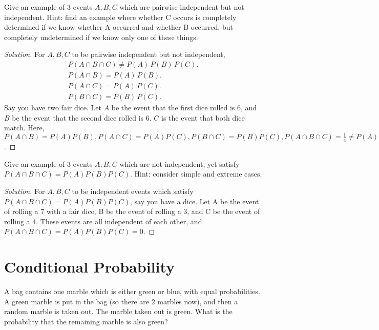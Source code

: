 \documentclass[10pt]{article}
\newenvironment{problem}[2][Problem]{\begin{trivlist}
\item[\hskip \labelsep {\bfseries #1}\hskip \labelsep {\bfseries #2.}]}{\end{trivlist}}
\begin{document}
\begin{problem}{3} 
Give an example of 3 events $A, B, C$ which are pairwise independent but not
independent. Hint: find an example where whether C occurs is completely
determined if we know whether A occurred and whether B occurred, but completely undetermined if we know only one of these things.
\end{problem}

\begin{proof}[Solution]
For $A, B, C$ to be pairwise independent but not independent,
\begin{equation}
\begin{split}
P(A \cap B \cap C) \neq P(A) \, P(B) \,P(C). \\
P(A \cap B) = P(A) \, P(B). \\
P(A \cap C) = P(A) \, P(C). \\
P(B \cap C) = P(B) \, P(C).
\end{split}
\end{equation}
Say you have two fair dice. Let $A$ be the event that the first dice rolled is 6, and $B$ be the event that the second dice rolled is 6. $C$ is the event that both dice match. Here, \(P(A \cap B) = P(A)P(B), P(A \cap C) = P(A)P(C), P(B \cap C) = P(B)P(C), P(A \cap B \cap C) = \frac{1}{4} \neq P(A)P(B)P(C)\).
\end{proof}

\begin{problem}{4} 
Give an example of 3 events $A, B, C$ which are not independent, yet satisfy
$P(A \cap B \cap C) = P(A)P(B)P(C)$. Hint: consider simple and extreme cases.
\end{problem}

\begin{proof}[Solution]
For $A, B, C$ to be independent events which satisfy $P(A \cap B \cap C) = P(A)P(B)P(C)$, say you have a dice. Let A be the event of rolling a 7 with a fair dice, B be the event of rolling a 3, and C be the event of rolling a 4. These events are all independent of each other, and $P(A \cap B \cap C) = P(A)P(B)P(C) = 0$.
\end{proof}

\section{Conditional Probability}

\begin{problem}{1} 
A bag contains one marble which is either green or blue, with equal probabilities. A green marble is put in the bag (so there are 2 marbles now), and then
a random marble is taken out. The marble taken out is green. What is the
probability that the remaining marble is also green?
\end{problem}
\end{document}
